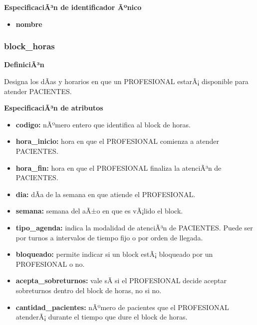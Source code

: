 \documentclass[a4paper,11pt]{article}
\begin{document}
\textbf{EspecificaciÃ³n de identificador Ãºnico}

\begin{itemize}

     \item \textbf{nombre}

\end{itemize}

\subsubsection{\textbf{block\_horas}}

\textbf{DefiniciÃ³n}

Designa los dÃ­as y horarios en que un PROFESIONAL estarÃ¡ disponible para atender 
PACIENTES.

\textbf{EspecificaciÃ³n de atributos}

\begin{itemize}

     \item \textbf{codigo:} nÃºmero entero que identifica al block de horas.

     \item \textbf{hora\_inicio:} hora en que el PROFESIONAL comienza a atender PACIENTES.

     \item \textbf{hora\_fin:} hora en que el PROFESIONAL finaliza la atenciÃ³n de PACIENTES.

     \item \textbf{dia:} dÃ­a de la semana en que atiende el PROFESIONAL.

     \item \textbf{semana:} semana del aÃ±o en que es vÃ¡lido el block.

     \item \textbf{tipo\_agenda:} indica la modalidad de atenciÃ³n de PACIENTES. Puede ser por 
     turnos a intervalos de tiempo fijo o por orden de llegada.

     \item \textbf{bloqueado:} permite indicar si un block estÃ¡ bloqueado por un PROFESIONAL o 
     no.

     \item \textbf{acepta\_sobreturnos:} vale sÃ­ si el PROFESIONAL decide aceptar sobreturnos dentro 
     del block de horas, no si no.

     \item \textbf{cantidad\_pacientes:} nÃºmero de pacientes que el PROFESIONAL atenderÃ¡ durante 
     el tiempo que dure el block de horas.

\end{itemize}
\end{document}
